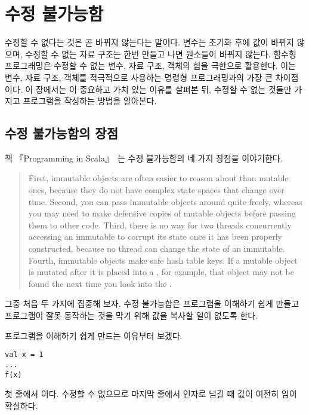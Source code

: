 \chapter{수정 불가능함}

수정할 수 없다는 것은 곧 바뀌지 않는다는 말이다. 
변수는 초기화 후에 값이 바뀌지 않으며, 수정할 수 없는 자료 구조는 한번 만들고
나면 원소들이 바뀌지 않는다. 함수형 프로그래밍은 수정할 수 없는 변수, 자료 구조,
객체의 힘을 극한으로 활용한다. 이는  변수, 자료 구조, 객체를
적극적으로 사용하는 명령형 프로그래밍과의 가장 큰 차이점이다. 이 장에서는
이 중요하고 가치 있는 이유를 살펴본 뒤, 수정할
수 없는 것들만 가지고 프로그램을 작성하는 방법을 알아본다.

\section{수정 불가능함의 장점}

책 『Programming in Scala』~\cite{programming-in-scala}는 수정 불가능함의 네 가지 장점을 이야기한다.

\begin{quote}
First, immutable objects are often easier to reason about than mutable ones,
because they do not have complex state spaces that change over time. Second, you
can pass immutable objects around quite freely, whereas you may need to make
defensive copies of mutable objects before passing them to other code. Third,
there is no way for two threads concurrently accessing an immutable to corrupt
its state once it has been properly constructed, because no thread can change the
state of an immutable. Fourth, immutable objects make safe hash table keys. If a
mutable object is mutated after it is placed into a , for example,
that object may not be found the next time you look into the .
\end{quote}

그중 처음 두 가지에 집중해 보자. 수정 불가능함은 프로그램을 이해하기 쉽게 만들고
프로그램이 잘못 동작하는 것을 막기 위해 값을 복사할 일이 없도록 한다.

프로그램을 이해하기 쉽게 만드는 이유부터 보겠다.

\begin{verbatim}
val x = 1
...
f(x)
\end{verbatim}

 첫 줄에서 이다.  수정할 수 없으므로 마지막 줄에서   인자로 넘길 때
 값이 여전히 임이 확실하다.

